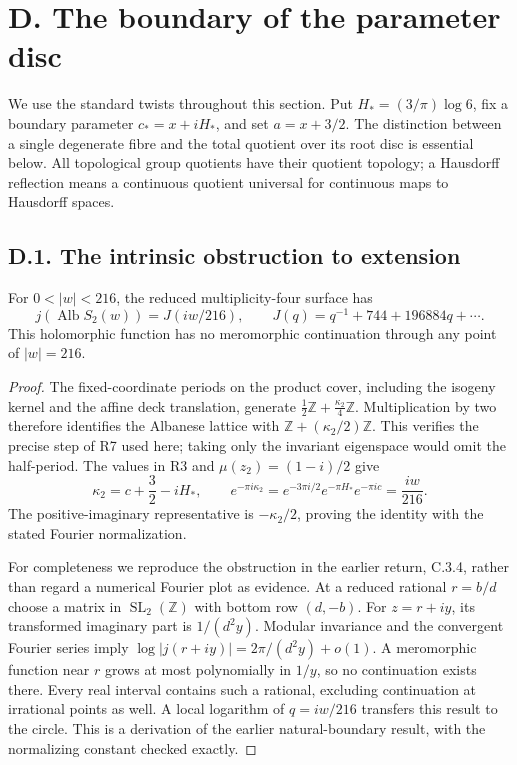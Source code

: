 \section{D. The boundary of the parameter disc}

We use the standard twists throughout this section. Put
\(H_*=(3/\pi)\log6\), fix a boundary parameter
\(c_*=x+iH_*\), and set \(a=x+3/2\). The distinction between a
single degenerate fibre and the total quotient over its root disc is
essential below. All topological group quotients have their quotient
topology; a Hausdorff reflection means a continuous quotient universal
for continuous maps to Hausdorff spaces.

\subsection{D.1. The intrinsic obstruction to extension}

\begin{proposition}[D.1.1; Proved]
For \(0<|w|<216\), the reduced multiplicity-four surface has
\[
 j(\operatorname{Alb}S_2(w))=J(iw/216),\qquad
 J(q)=q^{-1}+744+196884q+\cdots.
\]
This holomorphic function has no meromorphic continuation through any
point of \(|w|=216\).
\end{proposition}
\begin{proof}
The fixed-coordinate periods on the product cover, including the
isogeny kernel and the affine deck translation, generate
\(\frac12\mathbb Z+\frac{\kappa_2}{4}\mathbb Z\).
Multiplication by two therefore identifies the Albanese lattice with
\(\mathbb Z+(\kappa_2/2)\mathbb Z\). This verifies the precise step of
R7 used here; taking only the invariant eigenspace would omit the
half-period. The values in R3 and \(\mu(z_2)=(1-i)/2\) give
\[
 \kappa_2=c+\frac32-iH_*,\qquad
 e^{-\pi i\kappa_2}=e^{-3\pi i/2}e^{-\pi H_*}e^{-\pi ic}
 =\frac{iw}{216}.
\]
The positive-imaginary representative is \(-\kappa_2/2\), proving the
identity with the stated Fourier normalization.

For completeness we reproduce the obstruction in the earlier return,
C.3.4, rather than regard a numerical Fourier plot as evidence. At a
reduced rational \(r=b/d\) choose a matrix in
\(\operatorname{SL}_2(\mathbb Z)\) with bottom row \((d,-b)\).
For \(z=r+iy\), its transformed imaginary part is \(1/(d^2y)\).
Modular invariance and the convergent Fourier series imply
\(\log|j(r+iy)|=2\pi/(d^2y)+o(1)\).
A meromorphic function near \(r\) grows at most polynomially in
\(1/y\), so no continuation exists there. Every real interval contains
such a rational, excluding continuation at irrational points as well.
A local logarithm of \(q=iw/216\) transfers this result to the circle.
This is a derivation of the earlier natural-boundary result, with the
normalizing constant checked exactly.
\end{proof}

